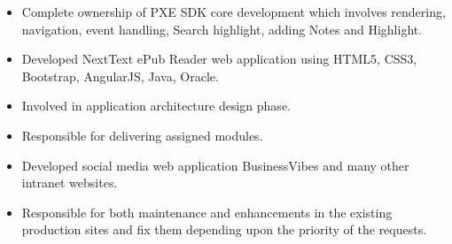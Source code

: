 \documentclass[11pt,a4paper,ragged2e]{altacv}
\begin{document}
\begin{itemize}
\item Complete ownership of PXE SDK core development which involves rendering,
navigation, event handling, Search highlight, adding Notes and Highlight.
\item Developed NextText ePub Reader web application using HTML5, CSS3,
Bootstrap, AngularJS, Java, Oracle.
\item Involved in application architecture design phase.
\item Responsible for delivering assigned modules.
\end{itemize}
\smallskip
\divider


\begin{itemize}
\item Developed social media web application BusinessVibes and many other intranet websites.
\item Responsible for both maintenance and enhancements in the existing production
sites and fix them depending upon the priority of the requests.
\smallskip
\end{itemize}











\end{document}
